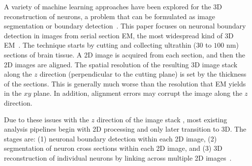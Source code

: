 \documentclass{article} %
\begin{document}
A variety of machine learning approaches have been explored for the 3D
reconstruction of neurons, a problem that can be formulated as image
segmentation or boundary detection~\cite{Jain2010,Tasdizen2014}.  This
paper focuses on neuronal boundary detection in images from serial
section EM, the most widespread kind of 3D EM~\cite{Briggman2012}. The technique starts by cutting and collecting ultrathin ($30$ to
$100$ nm) sections of brain tissue.  A 2D image is acquired from each
section, and then the 2D images are aligned.  The spatial resolution
of the resulting 3D image stack along the $z$ direction (perpendicular
to the cutting plane) is set by the thickness of the sections. This is
generally much worse than the resolution that EM yields in the $xy$
plane.  In addition, alignment errors may corrupt the image along the
$z$ direction.

Due to these issues with the $z$ direction of the image stack
\cite{Tasdizen2014,Jurrus2010}, most existing analysis pipelines begin
with 2D processing and only later transition to 3D.  The stages are:
(1) neuronal boundary detection within each 2D image, (2)
segmentation of neuron cross sections within each 2D image, and (3) 3D
reconstruction of individual neurons by linking across multiple 2D
images~\cite{Takemura2013,Liu2014}.


\end{document}
